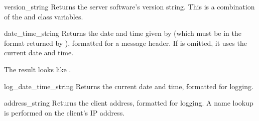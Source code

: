 \begin{methoddesc}{version_string}{}
Returns the server software's version string. This is a combination
of the  and  class variables.
\end{methoddesc}

\begin{methoddesc}{date_time_string}{}
Returns the date and time given by  (which must be in the
format returned by ), formatted for a message header.
If  is omitted, it uses the current date and time.

The result looks like .
\end{methoddesc}

\begin{methoddesc}{log_date_time_string}{}
Returns the current date and time, formatted for logging.
\end{methoddesc}

\begin{methoddesc}{address_string}{}
Returns the client address, formatted for logging. A name lookup
is performed on the client's IP address.
\end{methoddesc}


\begin{seealso}

\end{seealso}
